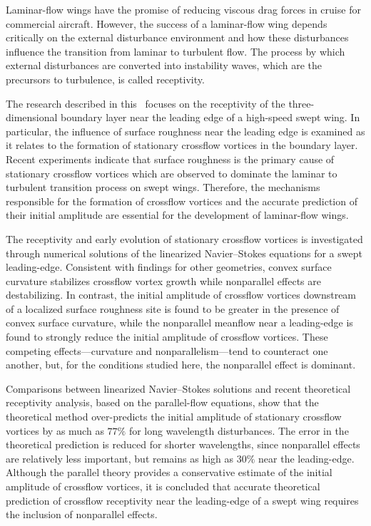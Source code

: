 %
%
%
%
%

Laminar-flow wings have the promise of reducing viscous drag forces in cruise
for commercial aircraft.  However, the success of a laminar-flow wing depends
critically on the external disturbance environment and how these disturbances
influence the transition from laminar to turbulent flow.  The process by which
external disturbances are converted into instability waves, which are the
precursors to turbulence, is called receptivity.

The research described in this \thesis\ focuses on the receptivity of the
three-dimensional boundary layer near the leading edge of a high-speed swept
wing.  In particular, the influence of surface roughness near the leading edge
is examined as it relates to the formation of stationary crossflow vortices in
the boundary layer.  Recent experiments indicate that surface roughness is the
primary cause of stationary crossflow vortices which are observed to dominate
the laminar to turbulent transition process on swept wings.  Therefore, the
mechanisms responsible for the formation of crossflow vortices and the
accurate prediction of their initial amplitude are essential for the
development of laminar-flow wings.

The receptivity and early evolution of stationary crossflow vortices is
investigated through numerical solutions of the linearized Navier--Stokes
equations for a swept leading-edge.  Consistent with findings for other
geometries, convex surface curvature stabilizes crossflow vortex growth while
nonparallel effects are destabilizing.  In contrast, the initial amplitude of
crossflow vortices downstream of a localized surface roughness site is found
to be greater in the presence of convex surface curvature, while the
nonparallel meanflow near a leading-edge is found to strongly reduce the
initial amplitude of crossflow vortices.  These competing effects---curvature
and nonparallelism---tend to counteract one another, but, for the conditions
studied here, the nonparallel effect is dominant.

Comparisons between linearized Navier--Stokes solutions and recent theoretical
receptivity analysis, based on the parallel-flow equations, show that the
theoretical method over-predicts the initial amplitude of stationary crossflow
vortices by as much as $77\%$ for long wavelength disturbances.  The error in
the theoretical prediction is reduced for shorter wavelengths, since
nonparallel effects are relatively less important, but remains as high as
$30\%$ near the leading-edge.  Although the parallel theory provides a
conservative estimate of the initial amplitude of crossflow vortices, it is
concluded that accurate theoretical prediction of crossflow receptivity near
the leading-edge of a swept wing requires the inclusion of nonparallel
effects.